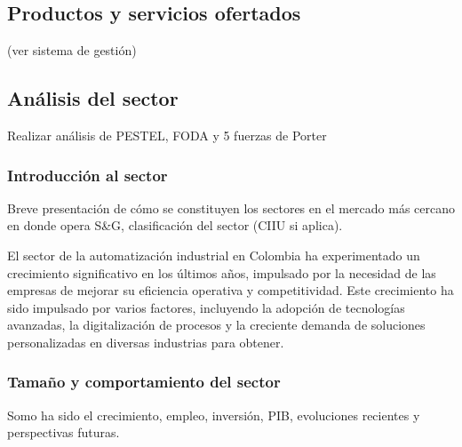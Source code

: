 \subsection{Productos y servicios ofertados} 
(ver sistema de gestión)

\subsection{Análisis del sector} 
Realizar análisis de PESTEL, FODA y 5 fuerzas de Porter

\subsubsection{Introducción al sector}
Breve presentación de cómo se constituyen los sectores en el mercado más cercano en donde opera S\&G, clasificación del sector (CIIU si aplica).

El sector de la automatización industrial en Colombia ha experimentado un crecimiento significativo en los últimos años, impulsado por la necesidad de las empresas de mejorar su eficiencia operativa y competitividad. Este crecimiento ha sido impulsado por varios factores, incluyendo la adopción de tecnologías avanzadas, la digitalización de procesos y la creciente demanda de soluciones personalizadas en diversas industrias para obtener.

\subsubsection{Tamaño y comportamiento del sector}
Somo ha sido el crecimiento, empleo, inversión, PIB, evoluciones recientes y perspectivas futuras.
